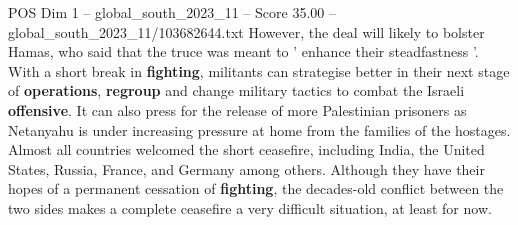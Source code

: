 \begin{textsample}{POS Dim 1 – global\_south\_2023\_11 – Score 35.00 – global\_south\_2023\_11/103682644.txt}
However, the deal will likely to bolster Hamas, who said that the truce was meant to ' enhance their steadfastness '.
With a short break in \textbf{fighting}, militants can strategise better in their next stage of \textbf{operations}, \textbf{regroup} and change military tactics to combat the Israeli \textbf{offensive}.
It can also press for the release of more Palestinian prisoners as Netanyahu is under increasing pressure at home from the families of the hostages.
Almost all countries welcomed the short ceasefire, including India, the United States, Russia, France, and Germany among others.
Although they have their hopes of a permanent cessation of \textbf{fighting}, the decades-old conflict between the two sides makes a complete ceasefire a very difficult situation, at least for now.

\end{textsample}
